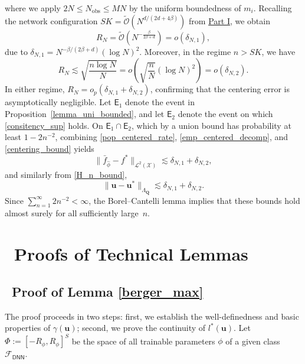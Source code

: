 \documentclass[
  12pt]{article}
\begin{document}
where we apply $2N\leq N_{\operatorname{obs}}\leq MN$ by the uniform boundedness of $m_i$. Recalling the network configuration $SK=\widetilde{\mathcal{O}}(N^{d/(2d+4\beta)})$ from \underline{Part I}, we obtain
$$R_N=\widetilde{\mathcal{O}}\!\left(N^{-\frac{\beta}{2\beta+d}}\right)=o(\delta_{N,1}),$$
due to $\delta_{N,1}=N^{-\beta/(2\beta+d)}(\log N)^2$. Moreover, in the regime $n>SK$, we have
$$R_N\lesssim \sqrt{\frac{n\log N}{N}}=o\!\left(\sqrt{\frac{n}{N}}(\log N)^2\right)=o(\delta_{N,2}).$$
In either regime, $R_N=o_p(\delta_{N,1}+\delta_{N,2})$, confirming that the centering error is asymptotically negligible. Let $\mathsf{E}_1$ denote the event in 
Proposition~\ref{lemma_uni_bounded}, and let $\mathsf{E}_2$ denote the event on which 
\eqref{consitency_sup} holds. On $\mathsf{E}_1 \cap \mathsf{E}_2$, which by a union 
bound has probability at least $1 - 2n^{-2}$, 
combining \eqref{pop_centered_rate}, \eqref{emp_centered_decomp}, and 
\eqref{centering_bound} yields
\[
    \|\bar{f}_{\widehat{\phi}} - f^*\|_{\mathcal{L}^2(\mathcal{X})} 
    \lesssim \delta_{N,1} + \delta_{N,2},
\]
and similarly from \eqref{H_n_bound},
\[
    \|\widehat{\boldsymbol{u}} - \boldsymbol{u}^*\|_{\Lambda_{\boldsymbol{Q}}} 
    \lesssim \delta_{N,1} + \delta_{N,2}.
\]
Since $\sum_{n=1}^{\infty} 2n^{-2} < \infty$, the Borel--Cantelli lemma 
implies that these bounds hold almost surely for all sufficiently 
large~$n$.

\section{~Proofs of Technical Lemmas}\label{appendix:lemma}

\subsection{~Proof of Lemma \ref{berger_max}}
The proof proceeds in two steps: first, we establish the well-definedness and basic properties of $\gamma(\boldsymbol{u})$; second, we prove the continuity of $l^*(\boldsymbol{u})$. Let $\Phi := [-R_\phi, R_\phi]^S$ be the space of all trainable parameters $\phi$ of a given class $\mathcal{F}_{\mathsf{DNN}}$.
\end{document}
